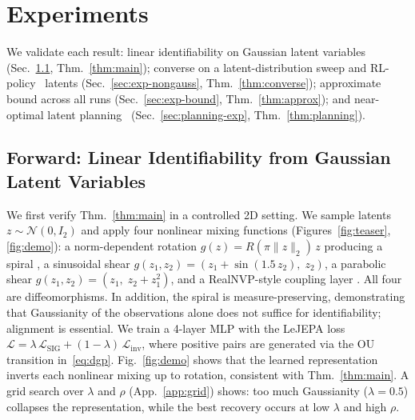 \documentclass{article}
\begin{document}
\section{Experiments}\label{sec:experiments}

We validate each result: linear identifiability on Gaussian latent variables (Sec.~\ref{sec:exp-gaussian}, Thm.~\ref{thm:main}); 
converse on a latent-distribution sweep and RL-policy~\citep{maes2026leworldmodel} latents (Sec.~\ref{sec:exp-nongauss}, Thm.~\ref{thm:converse});
approximate bound across all runs (Sec.~\ref{sec:exp-bound}, Thm.~\ref{thm:approx}); and near-optimal latent planning~\citep{tassa2018dmcontrol} (Sec.~\ref{sec:planning-exp}, Thm.~\ref{thm:planning}).


\subsection{Forward: Linear Identifiability from Gaussian Latent Variables}
\label{sec:exp-gaussian}

We first verify Thm.~\ref{thm:main} in a controlled 2D setting.
We sample latents $z \sim \mathcal{N}(0, I_2)$ and apply four nonlinear mixing functions (Figures~\ref{fig:teaser}, \ref{fig:demo}):
a norm-dependent rotation $g(z) = R(\pi\|z\|_2)\,z$ producing a spiral \citep[c.f.][]{buchholz2025robustness},
a sinusoidal shear $g(z_1, z_2) = (z_1 + \sin(1.5\,z_2),\; z_2)$,
a parabolic shear $g(z_1, z_2) = (z_1,\; z_2 + z_1^2)$,
and a RealNVP-style coupling layer \citep{dinh2016density}.
All four are diffeomorphisms.
In addition, the spiral is measure-preserving, demonstrating that Gaussianity of the observations alone does not suffice for identifiability; alignment is essential.
We train a 4-layer MLP with the LeJEPA loss $\mathcal{L} = \lambda\,\mathcal{L}_{\mathrm{SIG}} + (1-\lambda)\,\mathcal{L}_{\mathrm{inv}}$, where positive pairs are generated via the OU transition in~\eqref{eq:dgp}.
Fig.~\ref{fig:demo} shows that the learned representation inverts each nonlinear mixing up to rotation, consistent with Thm.~\ref{thm:main}.
A grid search over $\lambda$ and $\rho$ (App.~\ref{app:grid}) shows: too much Gaussianity ($\lambda = 0.5$) collapses the representation, while the best recovery occurs at low $\lambda$ and high $\rho$.
\end{document}
